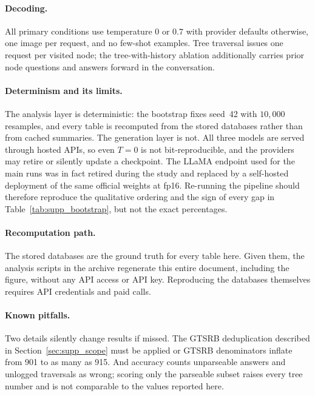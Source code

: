 \documentclass[10pt,twocolumn,letterpaper]{article}
\begin{document}
\paragraph{Decoding.} All primary conditions use temperature $0$ or $0.7$ with
provider defaults otherwise, one image per request, and no few-shot examples.
Tree traversal issues one request per visited node; the tree-with-history
ablation additionally carries prior node questions and answers forward in the
conversation.

\paragraph{Determinism and its limits.} The analysis layer is deterministic:
the bootstrap fixes seed~42 with $10{,}000$ resamples, and every table is
recomputed from the stored databases rather than from cached summaries. The
generation layer is not. All three models are served through hosted APIs, so
even $T{=}0$ is not bit-reproducible, and the providers may retire or silently
update a checkpoint. The LLaMA endpoint used for the main runs was in fact
retired during the study and replaced by a self-hosted deployment of the same
official weights at fp16. Re-running the pipeline should therefore reproduce
the qualitative ordering and the sign of every gap in
Table~\ref{tab:supp_bootstrap}, but not the exact percentages.

\paragraph{Recomputation path.} The stored databases are the ground truth for
every table here. Given them, the analysis scripts in the archive regenerate
this entire document, including the figure, without any API access or API key.
Reproducing the databases themselves requires API credentials and paid calls.

\paragraph{Known pitfalls.} Two details silently change results if missed. The
GTSRB deduplication described in Section~\ref{sec:supp_scope} must be applied
or GTSRB denominators inflate from 901 to as many as 915. And accuracy counts
unparseable answers and unlogged traversals as wrong; scoring only the
parseable subset raises every tree number and is not comparable to the values
reported here.
\end{document}
